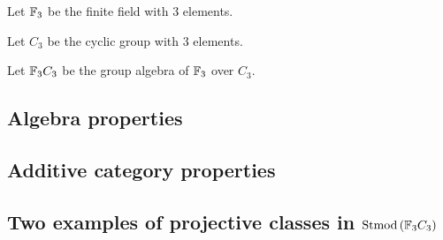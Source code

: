 \begin{notation}
    Let \( {\mathbb{F}}_3 \) be the finite field with \( 3 \) elements.
\end{notation}

\begin{notation}
    Let \( C_3 \) be the cyclic group with \( 3 \) elements.
\end{notation}

\begin{notation}
    Let \( {\mathbb{F}}_3 C_3 \) be the group algebra of \( {\mathbb{F}}_3 \) over \( C_3 \).
\end{notation}

\subsection{Algebra properties}



\subsection{Additive category properties}



\subsection{Two examples of projective classes in \texorpdfstring{\( \operatorname{Stmod}\left(  {\mathbb{F}}_3 C_3  \right) \)}{Stmod(F\_3C\_3)}}

